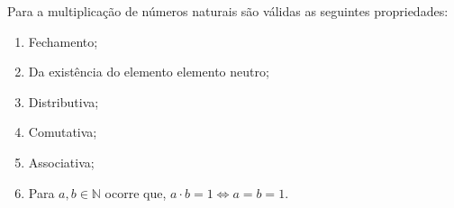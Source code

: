 \documentclass[../main.tex]{subfiles}
\begin{document}
\begin{teo}
    Para a multiplicação de números naturais são válidas as seguintes propriedades:
    \begin{enumerate}[label=(\roman*)]
        \item Fechamento;
        \item Da existência do elemento elemento neutro; 
        \item Distributiva;
        \item Comutativa;
        \item Associativa;
        \item Para $a,b \in \mathbb{N}$ ocorre que, $a \cdot b = 1 \iff a = b = 1$.
    \end{enumerate}
\end{teo}
\end{document}
